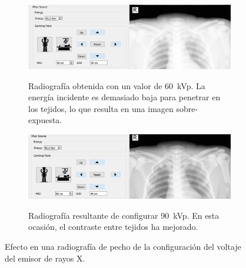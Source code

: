 \begin{figure}[h]
    \begin{subfigure}[b]{0.9\linewidth}
        \centering
        {\includegraphics[width=\linewidth]{IMG/60kvp.png}}
        \caption{Radiografía obtenida con un valor de 60~\ac{kVp}.  La energía incidente es demasiado baja para penetrar en los tejidos, lo que resulta en una imagen sobre-expuesta.\label{fig:60kvp}}
    \end{subfigure}
    
     \begin{subfigure}[b]{0.9\linewidth}
        \centering
        {\includegraphics[width=\linewidth]{IMG/90kvp.png}}
        \caption{ Radiografía resultante de configurar 90~\ac{kVp}. En esta ocasión, el contraste entre tejidos ha mejorado.\label{fig:90kvp}}
    \end{subfigure}
    \caption{Efecto en una radiografía de pecho de la configuración del voltaje del emisor de rayos X. \label{fig:setup}}
   \end{figure}
   


  







